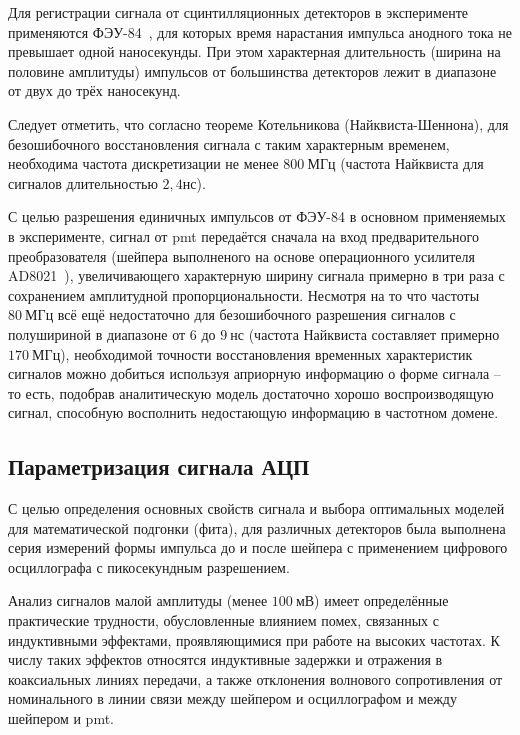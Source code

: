 Для регистрации сигнала от сцинтилляционных детекторов в эксперименте
применяются ФЭУ-84~\cite{soviet_pmts}, для которых время нарастания
импульса анодного тока не превышает одной наносекунды. При этом
характерная длительность (ширина на половине амплитуды) импульсов от
большинства детекторов лежит в диапазоне от двух до трёх наносекунд.

Следует отметить, что согласно теореме Котельникова (Найквиста-Шеннона),
для безошибочного восстановления сигнала с таким характерным временем,
необходима частота дискретизации не менее $800~\text{МГц}$ (частота
Найквиста для сигналов длительностью $2{,}4\text{нс}$).

С целью разрешения единичных импульсов от ФЭУ-84 в основном применяемых в
эксперименте, сигнал от \acrshort{pmt} передаётся сначала на вход
предварительного преобразователя (шейпера выполненого на основе
операционного усилителя AD8021~\cite{ad8021}), увеличивающего характерную
ширину сигнала примерно в три раза с сохранением амплитудной
пропорциональности. Несмотря
на то что частоты $80~\text{МГц}$ всё ещё недостаточно для безошибочного
разрешения сигналов с полушириной в диапазоне от $6$ до $9~\text{нс}$
(частота Найквиста составляет примерно $170~\text{МГц}$), необходимой
точности восстановления временных характеристик сигналов можно
добиться используя априорную информацию о форме сигнала -- то есть,
подобрав аналитическую модель достаточно хорошо воспроизводящую сигнал,
способную восполнить недостающую информацию в частотном домене.

\subsection{Параметризация сигнала АЦП}

С целью определения основных свойств сигнала и выбора оптимальных моделей для
математической подгонки (фита), для различных детекторов была выполнена серия
измерений формы импульса до и после шейпера с применением цифрового
осциллографа с пикосекундным разрешением.

Анализ сигналов малой амплитуды (менее $100~\text{мВ}$) имеет
определённые практические трудности, обусловленные влиянием помех,
связанных с индуктивными эффектами, проявляющимися при работе на высоких
частотах. К числу таких эффектов относятся индуктивные задержки и
отражения в коаксиальных линиях передачи, а также отклонения
волнового сопротивления от номинального в линии связи между
шейпером и осциллографом и между шейпером и \acrshort{pmt}.

